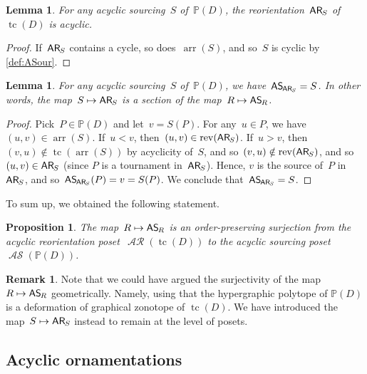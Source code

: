 \documentclass{amsart}
\newtheorem{proposition}[theorem]{Proposition}
\newtheorem{lemma}[theorem]{Lemma}
\theoremstyle{definition}
\newtheorem{remark}[theorem]{Remark}
\renewcommand{\c}[1]{\mathcal{#1}} %
\DeclareMathOperator{\tc}{tc} %
\newcommand{\mymap}[2]{\mathsf{#1}_{\hspace{-.7pt}#2}}
\DeclareMathOperator{\AReori}{\c{AR}}  %
\newcommand{\areori}[1]{\mymap{AR}{#1}}  %
\DeclareMathOperator{\rev}{rev} %
\DeclareMathOperator{\ASour}{\mathcal{AS}}  %
\newcommand{\asour}[1]{\mymap{AS}{#1}}  %
\DeclareMathOperator{\arr}{arr} %
\newcommand{\PP}{\mathbb P} %
\begin{document}
\begin{lemma}
\label{lem:ASour2AReori1}
For any acyclic sourcing~$S$ of~$\PP(D)$, the reorientation~$\areori{S}$ of~$\tc(D)$ is acyclic.
\end{lemma}

\begin{proof}
If~$\areori{S}$ contains a cycle, so does~$\arr(S)$, and so~$S$ is cyclic by \cref{def:ASour}.
\end{proof}

\begin{lemma}
\label{lem:ASour2AReori2}
For any acyclic sourcing~$S$ of~$\PP(D)$, we have~$\asour{\areori{S}} = S$. In other words, the map~$S \mapsto \areori{S}$ is a section of the map~$R \mapsto \asour{R}$.
\end{lemma}

\begin{proof}
Pick~$P \in \PP(D)$ and let~$v = S(P)$.
For any~$u \in P$, we have~$(u,v) \in \arr(S)$.
If~$u < v$, then~$(u,v) \in \rev(\areori{S})$.
If~$u > v$, then~$(v,u) \notin \tc(\arr(S))$ by acyclicity of~$S$, and so~$(v,u) \notin \rev(\areori{S})$, and so~$(u,v) \in \areori{S}$ (since $P$ is a tournament in~$\areori{S}$).
Hence, $v$ is the source of~$P$ in~$\areori{S}$, and so~$\asour{\areori{S}}(P) = v = S(P)$.
We conclude that~$\asour{\areori{S}} = S$. 
\end{proof}

To sum up, we obtained the following statement.

\begin{proposition}
\label{prop:AReori2ASour}
The map~$R \mapsto \asour{R}$ is an order-preserving surjection from the acyclic reorientation poset~$\AReori(\tc(D))$ to the acyclic sourcing poset~$\ASour(\PP(D))$.
\end{proposition}

\begin{remark}
Note that we could have argued the surjectivity of the map~$R \mapsto \asour{R}$ geometrically.
Namely, using that the hypergraphic polytope of $\PP(D)$ is a deformation of graphical zonotope of $\tc(D)$.
We have introduced the map~$S \mapsto \areori{S}$ instead to remain at the level of posets.
\end{remark}


\subsection{Acyclic ornamentations}
\label{subsec:acyclicOrnamentations}
\end{document}
